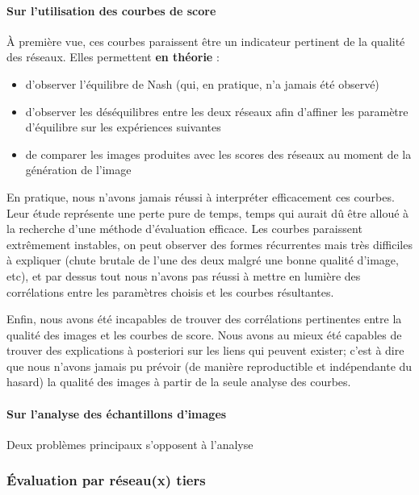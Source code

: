 \paragraph{Sur l'utilisation des courbes de score}

À première vue, ces courbes paraissent être un indicateur pertinent de la qualité des réseaux. Elles permettent \textbf{en théorie} :
\begin{itemize}
  \item d'observer l'équilibre de Nash (qui, en pratique, n'a jamais été observé)
  \item d'observer les déséquilibres entre les deux réseaux afin d'affiner les paramètre d'équilibre sur les expériences suivantes
  \item de comparer les images produites avec les scores des réseaux au moment de la génération de l'image
\end{itemize}

En pratique, nous n'avons jamais réussi à interpréter efficacement ces courbes. Leur étude représente une perte pure de temps, temps qui aurait dû être alloué à la recherche d'une méthode d'évaluation efficace. Les courbes paraissent extrêmement instables, on peut observer des formes récurrentes mais très difficiles à expliquer (chute brutale de l'une des deux malgré une bonne qualité d'image, etc), et par dessus tout nous n'avons pas réussi à mettre en lumière des corrélations entre les paramètres choisis et les courbes résultantes.

Enfin, nous avons été incapables de trouver des corrélations pertinentes entre la qualité des images et les courbes de score. Nous avons au mieux été capables de trouver des explications à posteriori sur les liens qui peuvent exister; c'est à dire que nous n'avons jamais pu prévoir (de manière reproductible et indépendante du hasard) la qualité des images à partir de la seule analyse des courbes.

\paragraph{Sur l'analyse des échantillons d'images}

Deux problèmes principaux s'opposent à l'analyse %

\subsubsection{Évaluation par réseau(x) tiers}

